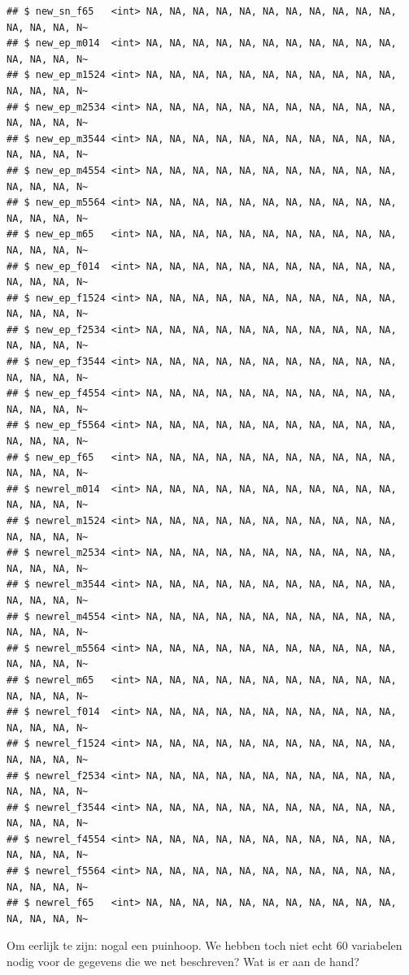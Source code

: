 \documentclass[]{tufte-book}
\begin{document}
\begin{verbatim}
## $ new_sn_f65   <int> NA, NA, NA, NA, NA, NA, NA, NA, NA, NA, NA, NA, NA, NA, N~
## $ new_ep_m014  <int> NA, NA, NA, NA, NA, NA, NA, NA, NA, NA, NA, NA, NA, NA, N~
## $ new_ep_m1524 <int> NA, NA, NA, NA, NA, NA, NA, NA, NA, NA, NA, NA, NA, NA, N~
## $ new_ep_m2534 <int> NA, NA, NA, NA, NA, NA, NA, NA, NA, NA, NA, NA, NA, NA, N~
## $ new_ep_m3544 <int> NA, NA, NA, NA, NA, NA, NA, NA, NA, NA, NA, NA, NA, NA, N~
## $ new_ep_m4554 <int> NA, NA, NA, NA, NA, NA, NA, NA, NA, NA, NA, NA, NA, NA, N~
## $ new_ep_m5564 <int> NA, NA, NA, NA, NA, NA, NA, NA, NA, NA, NA, NA, NA, NA, N~
## $ new_ep_m65   <int> NA, NA, NA, NA, NA, NA, NA, NA, NA, NA, NA, NA, NA, NA, N~
## $ new_ep_f014  <int> NA, NA, NA, NA, NA, NA, NA, NA, NA, NA, NA, NA, NA, NA, N~
## $ new_ep_f1524 <int> NA, NA, NA, NA, NA, NA, NA, NA, NA, NA, NA, NA, NA, NA, N~
## $ new_ep_f2534 <int> NA, NA, NA, NA, NA, NA, NA, NA, NA, NA, NA, NA, NA, NA, N~
## $ new_ep_f3544 <int> NA, NA, NA, NA, NA, NA, NA, NA, NA, NA, NA, NA, NA, NA, N~
## $ new_ep_f4554 <int> NA, NA, NA, NA, NA, NA, NA, NA, NA, NA, NA, NA, NA, NA, N~
## $ new_ep_f5564 <int> NA, NA, NA, NA, NA, NA, NA, NA, NA, NA, NA, NA, NA, NA, N~
## $ new_ep_f65   <int> NA, NA, NA, NA, NA, NA, NA, NA, NA, NA, NA, NA, NA, NA, N~
## $ newrel_m014  <int> NA, NA, NA, NA, NA, NA, NA, NA, NA, NA, NA, NA, NA, NA, N~
## $ newrel_m1524 <int> NA, NA, NA, NA, NA, NA, NA, NA, NA, NA, NA, NA, NA, NA, N~
## $ newrel_m2534 <int> NA, NA, NA, NA, NA, NA, NA, NA, NA, NA, NA, NA, NA, NA, N~
## $ newrel_m3544 <int> NA, NA, NA, NA, NA, NA, NA, NA, NA, NA, NA, NA, NA, NA, N~
## $ newrel_m4554 <int> NA, NA, NA, NA, NA, NA, NA, NA, NA, NA, NA, NA, NA, NA, N~
## $ newrel_m5564 <int> NA, NA, NA, NA, NA, NA, NA, NA, NA, NA, NA, NA, NA, NA, N~
## $ newrel_m65   <int> NA, NA, NA, NA, NA, NA, NA, NA, NA, NA, NA, NA, NA, NA, N~
## $ newrel_f014  <int> NA, NA, NA, NA, NA, NA, NA, NA, NA, NA, NA, NA, NA, NA, N~
## $ newrel_f1524 <int> NA, NA, NA, NA, NA, NA, NA, NA, NA, NA, NA, NA, NA, NA, N~
## $ newrel_f2534 <int> NA, NA, NA, NA, NA, NA, NA, NA, NA, NA, NA, NA, NA, NA, N~
## $ newrel_f3544 <int> NA, NA, NA, NA, NA, NA, NA, NA, NA, NA, NA, NA, NA, NA, N~
## $ newrel_f4554 <int> NA, NA, NA, NA, NA, NA, NA, NA, NA, NA, NA, NA, NA, NA, N~
## $ newrel_f5564 <int> NA, NA, NA, NA, NA, NA, NA, NA, NA, NA, NA, NA, NA, NA, N~
## $ newrel_f65   <int> NA, NA, NA, NA, NA, NA, NA, NA, NA, NA, NA, NA, NA, NA, N~
\end{verbatim}

Om eerlijk te zijn: nogal een puinhoop. We hebben toch niet echt 60 variabelen nodig voor de gegevens die we net beschreven? Wat is er aan de hand?
\end{document}
